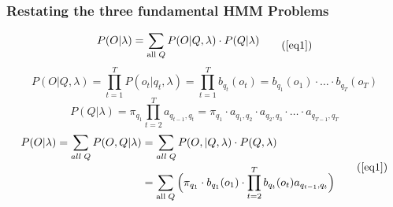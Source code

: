 \begin{frame}
  \frametitle{Restating the three fundamental HMM Problems}
  \begin{equation}
    \begin{split}
      P(O \vert \lambda) = \displaystyle\sum_{\text{all}\;Q} P(O \vert
      Q, \lambda) \cdot P(Q \vert \lambda)
    \end{split}
    \tag{\ref{eq1}}
  \end{equation}
  \pause \vspace*{.em}
  \begin{equation}
    P(O \vert Q, \lambda) = \displaystyle\prod_{t=1}^{T} P(o_t \vert
    q_t, \lambda)= \displaystyle\prod_{t=1}^{T} b_{q_t}(o_t) =
    b_{q_1}(o_1) \cdot \ldots \cdot b_{q_T}(o_T)
    \label{eq:pql}
  \end{equation}\pause
  \vspace*{.em}
  \begin{equation}
    P(Q | \lambda) = \pi_{q_1}\displaystyle\prod_{t=2}^{T}
    a_{q_{t-1},q_t} = \pi_{q_1} \cdot a_{q_1,q_2} \cdot a_{q_2,q_3} \cdot \ldots \cdot
    a_{q_{T-1},q_T}\label{eq:pql2}
  \end{equation}\pause
  \vspace*{.em}
  \begin{equation}
    \begin{split}
      P(O \vert \lambda) = \displaystyle\sum_{all\;Q} P(O, Q \vert
      \lambda) & = \displaystyle\sum_{all\;Q} P(O,\vert Q, \lambda)
      \cdot P(Q, \lambda) \\
      & = \displaystyle\sum_{\text{all}\;Q} \Big( \pi_{q_1} \cdot
      b_{q_1}(o_1) \cdot \displaystyle\prod_{t=2}^{T} b_{q_t}(o_t)
      a_{q_{t-1},q_t} \Big)
    \end{split}
    \tag{\ref{eq1}}
  \end{equation}
\end{frame}

